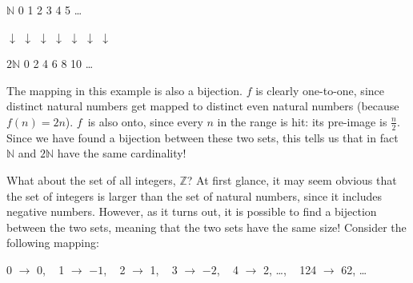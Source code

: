 \documentclass[11pt,fleqn]{article}
\begin{document}
\vspace{.1cm}
$\mathbb{N}$ \hspace{2.22cm} 0 \hspace{.3cm} 1 \hspace{.3cm} 2 \hspace{.3cm} 3 \hspace{.3cm} 4 \hspace{.3cm} 5 \hspace{.3cm} \ldots

\hspace{.5mm}$\downarrow$ \hspace{2.26cm} $\downarrow$ \hspace{.3cm} $\downarrow$ \hspace{.3cm} $\downarrow$ \hspace{.3cm} $\downarrow$ \hspace{.3cm} $\downarrow$ \hspace{.3cm} $\downarrow$

$2\mathbb{N}$ \hspace{2.04cm} 0 \hspace{.3cm} 2 \hspace{.3cm} 4 \hspace{.3cm} 6 \hspace{.3cm} 8 \hspace{.2cm} 10 \hspace{.3cm} \ldots
\vspace{.1cm}


The mapping in this example is also a bijection. $f$ is clearly one-to-one, since
distinct natural numbers get mapped to distinct even natural numbers (because $f(n)=2n$).
$f$~is also onto, since every $n$ in the range is hit: its pre-image is
$\frac{n}{2}$.  Since we have found a bijection between these two sets, this tells us
that in fact $\mathbb{N}$ and $2\mathbb{N}$ have the same cardinality!

What about the set of all integers, $\mathbb{Z}$? At first glance, it may seem
obvious that the set of integers
is larger than the set of natural numbers, since it includes negative numbers.
However, as it turns out, it is possible
to find a bijection between the two sets, meaning that the two sets have the same
size! Consider the following mapping:

\vspace{.1cm}
0 $\rightarrow$ 0, ~ 1 $\rightarrow$  $-1$, ~ 2 $\rightarrow$  1, ~ 3
$\rightarrow$  $-2$, ~ 4 $\rightarrow$  2, \; \ldots, ~ 124 $\rightarrow$ 62, \;
\ldots
\vspace{.1cm}
\end{document}
